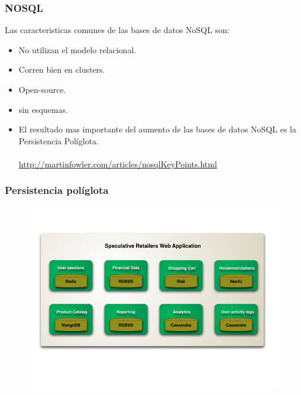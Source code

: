 \documentclass{beamer}
\begin{document}
\begin{frame}
\frametitle{NOSQL}
Las caracteristicas comunes de las bases de datos NoSQL son:
\begin{itemize}[<+->]
\item No utilizan el modelo relacional.
\item Corren bien en clusters.
\item Open-source.
\item sin esquemas.
\item El resultado mas importante del aumento de las bases de datos NoSQL es la {\color{green}Persistencia Pol\'iglota}.
\\~\\
{\color{blue}\url{http://martinfowler.com/articles/nosqlKeyPoints.html}}
\end{itemize}

\end{frame}

\begin{frame}
\frametitle{Persistencia pol\'iglota}
\begin{figure}
\includegraphics[width=1.0\linewidth]{polyglot.png}
\end{figure}
\end{frame}
\end{document}
